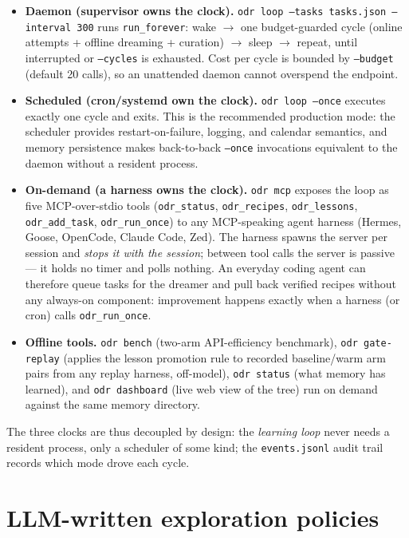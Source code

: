 \documentclass[11pt,a4paper]{article}
\newcommand{\hdr}[1]{\textbf{#1}}
\begin{document}
\begin{itemize}
  \item \hdr{Daemon (supervisor owns the clock).}
  \texttt{odr loop --tasks tasks.json --interval 300} runs
  \texttt{run\_forever}: wake $\rightarrow$ one budget-guarded cycle
  (online attempts + offline dreaming + curation) $\rightarrow$ sleep
  $\rightarrow$ repeat, until interrupted or \texttt{--cycles} is exhausted.
  Cost per cycle is bounded by \texttt{--budget} (default 20 calls), so an
  unattended daemon cannot overspend the endpoint.
  \item \hdr{Scheduled (cron/systemd own the clock).}
  \texttt{odr loop --once} executes exactly one cycle and exits. This is the
  recommended production mode: the scheduler provides restart-on-failure,
  logging, and calendar semantics, and memory persistence makes back-to-back
  \texttt{--once} invocations equivalent to the daemon without a resident
  process.
  \item \hdr{On-demand (a harness owns the clock).}
  \texttt{odr mcp} exposes the loop as five MCP-over-stdio tools
  (\texttt{odr\_status}, \texttt{odr\_recipes}, \texttt{odr\_lessons},
  \texttt{odr\_add\_task}, \texttt{odr\_run\_once}) to any MCP-speaking agent
  harness (Hermes, Goose, OpenCode, Claude Code, Zed). The harness spawns the
  server per session and \emph{stops it with the session}; between tool
  calls the server is passive --- it holds no timer and polls nothing. An
  everyday coding agent can therefore queue tasks for the dreamer and pull
  back verified recipes without any always-on component: improvement happens
  exactly when a harness (or cron) calls \texttt{odr\_run\_once}.
  \item \hdr{Offline tools.} \texttt{odr bench} (two-arm API-efficiency
  benchmark), \texttt{odr gate-replay} (applies the lesson promotion rule to
  recorded baseline/warm arm pairs from any replay harness, off-model),
  \texttt{odr status} (what memory has learned), and
  \texttt{odr dashboard} (live web view of the tree) run on demand against
  the same memory directory.
\end{itemize}

The three clocks are thus decoupled by design: the \emph{learning loop}
never needs a resident process, only a scheduler of some kind; the
\texttt{events.jsonl} audit trail records which mode drove each cycle.

\section{LLM-written exploration policies}
\label{sec:policy}
\end{document}
